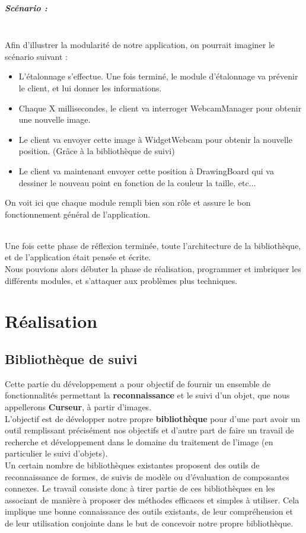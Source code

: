 \documentclass{report}
\begin{document}
				\paragraph{Scénario :} \ \\
				Afin d'illustrer la modularité de notre application, on pourrait imaginer le scénario suivant :
				\begin{itemize}
					\item L'étalonnage s'effectue. Une fois terminé, le module d'étalonnage va prévenir le client, et lui donner les informations.
					\item Chaque X millisecondes, le client va interroger WebcamManager pour obtenir une nouvelle image.
					\item Le client va envoyer cette image à WidgetWebcam pour obtenir la nouvelle position. (Grâce à la bibliothèque de suivi)
					\item Le client va maintenant envoyer cette position à DrawingBoard qui va dessiner le nouveau point en fonction de la couleur la taille, etc...
				\end{itemize}
				On voit ici que chaque module rempli bien son rôle et assure le bon fonctionnement général de l'application.
				
				$$$$ \\
				Une fois cette phase de réflexion terminée, toute l'architecture de la bibliothèque, et de l'application était pensée et écrite. \\
				Nous pouvions alors débuter la phase de réalisation, programmer et imbriquer les différents modules, et s'attaquer aux problèmes plus techniques.

				
	
	\chapter{Réalisation}
		\section{Bibliothèque de suivi}
			Cette partie du développement a pour objectif de fournir un ensemble de fonctionnalités permettant la \textbf{reconnaissance} et le suivi d'un objet, que nous appellerons \textbf{Curseur}, à partir d'images. \\
			L'objectif est de développer notre propre \textbf{bibliothèque} pour d'une part avoir un outil remplissant précisément nos objectifs et d'autre part de faire un travail de recherche et développement dans le domaine du traitement de l'image (en particulier le suivi d'objets). \\
			Un certain nombre de bibliothèques existantes proposent des outils de reconnaissance de formes, de suivis de modèle ou d'évaluation de composantes connexes. Le travail consiste donc à tirer partie de ces bibliothèques en les associant de manière à proposer des méthodes efficaces et simples à utiliser. Cela implique une bonne connaissance des outils existants, de leur compréhension et de leur utilisation conjointe dans le but de concevoir notre propre bibliothèque. \\	
				\newpage
\end{document}
